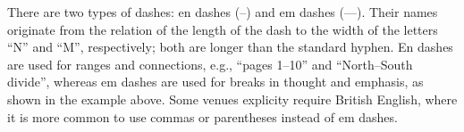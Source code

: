 


\noindent There are two types of dashes: en dashes (--) and em dashes (---).
Their names originate from the relation of the length of the dash to the width of the letters ``N'' and ``M'', respectively; both are longer than the standard hyphen.
En dashes are used for ranges and connections, e.g., ``pages 1--10'' and ``North--South divide'', whereas em dashes are used for breaks in thought and emphasis, as shown in the example above.
Some venues explicity require British English, where it is more common to use commas or parentheses instead of em dashes.
